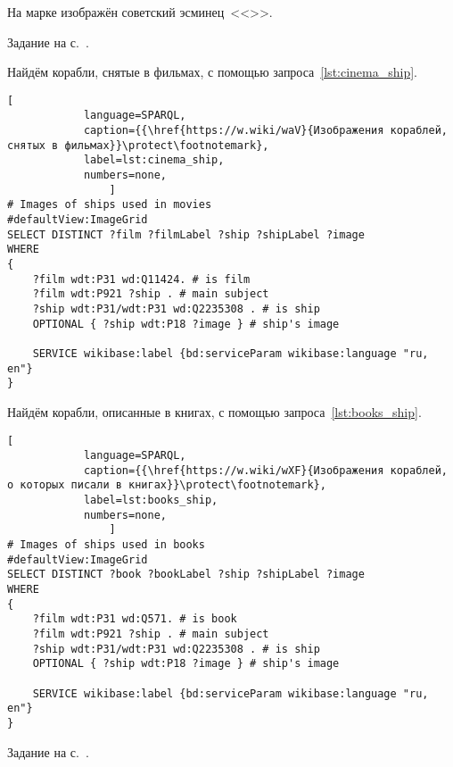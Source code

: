 \begin{task}
\label{answer:ship_stamp}
На марке изображён советский эсминец~<<>>.

\small{Задание на с.~\pageref{question:ship_stamp}.}
\end{task}




\begin{task}
\label{answer:ship_book}

Найдём корабли, снятые в фильмах, с помощью запроса~\ref{lst:cinema_ship}. 

\begin{lstlisting}[ 
            language=SPARQL, 
            caption={{\href{https://w.wiki/waV}{Изображения кораблей, снятых в фильмах}}\protect\footnotemark}, 
            label=lst:cinema_ship, 
            numbers=none,
                ]
# Images of ships used in movies
#defaultView:ImageGrid
SELECT DISTINCT ?film ?filmLabel ?ship ?shipLabel ?image
WHERE
{
	?film wdt:P31 wd:Q11424. # is film	
	?film wdt:P921 ?ship . # main subject
	?ship wdt:P31/wdt:P31 wd:Q2235308 . # is ship
	OPTIONAL { ?ship wdt:P18 ?image } # ship's image
								
	SERVICE wikibase:label {bd:serviceParam wikibase:language "ru, en"}
}
\end{lstlisting}



\newpage
Найдём корабли, описанные в книгах, с помощью запроса~\ref{lst:books_ship}. 
\begin{lstlisting}[ 
            language=SPARQL, 
            caption={{\href{https://w.wiki/wXF}{Изображения кораблей, о которых писали в книгах}}\protect\footnotemark}, 
            label=lst:books_ship, 
            numbers=none,
                ]
# Images of ships used in books
#defaultView:ImageGrid
SELECT DISTINCT ?book ?bookLabel ?ship ?shipLabel ?image
WHERE
{
	?film wdt:P31 wd:Q571. # is book	
	?film wdt:P921 ?ship . # main subject
	?ship wdt:P31/wdt:P31 wd:Q2235308 . # is ship
	OPTIONAL { ?ship wdt:P18 ?image } # ship's image
									
	SERVICE wikibase:label {bd:serviceParam wikibase:language "ru, en"}
}
\end{lstlisting}
	
\small{Задание на с.~\pageref{question:ship_book}.}
\end{task}






